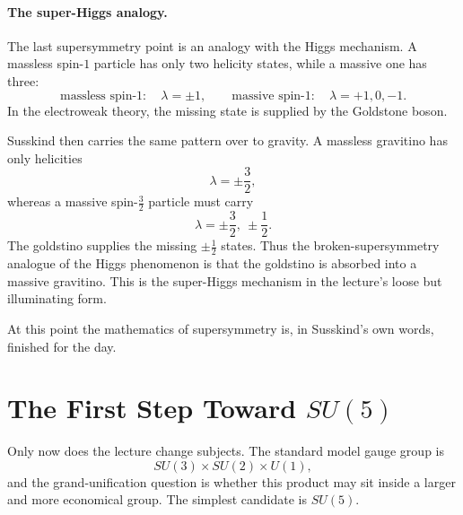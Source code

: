 \paragraph{The super-Higgs analogy.}
The last supersymmetry point is an analogy with the Higgs mechanism. A massless spin-\(1\) particle has only two helicity states, while a massive one has three:
\begin{equation}
\text{massless spin-1}: \quad \lambda=\pm 1,
\qquad
\text{massive spin-1}: \quad \lambda=+1,0,-1.
\end{equation}
In the electroweak theory, the missing state is supplied by the Goldstone boson.

Susskind then carries the same pattern over to gravity. A massless gravitino has only helicities
\begin{equation}
\lambda=\pm \frac{3}{2},
\end{equation}
whereas a massive spin-\(\tfrac{3}{2}\) particle must carry
\begin{equation}
\lambda=\pm\frac{3}{2},\ \pm\frac{1}{2}.
\end{equation}
The goldstino supplies the missing \(\pm \tfrac{1}{2}\) states. Thus the broken-supersymmetry analogue of the Higgs phenomenon is that the goldstino is absorbed into a massive gravitino. This is the super-Higgs mechanism in the lecture's loose but illuminating form.

At this point the mathematics of supersymmetry is, in Susskind's own words, finished for the day.

\section{The First Step Toward \(SU(5)\)}

Only now does the lecture change subjects. The standard model gauge group is
\begin{equation}
SU(3)\times SU(2)\times U(1),
\end{equation}
and the grand-unification question is whether this product may sit inside a larger and more economical group. The simplest candidate is \(SU(5)\).

